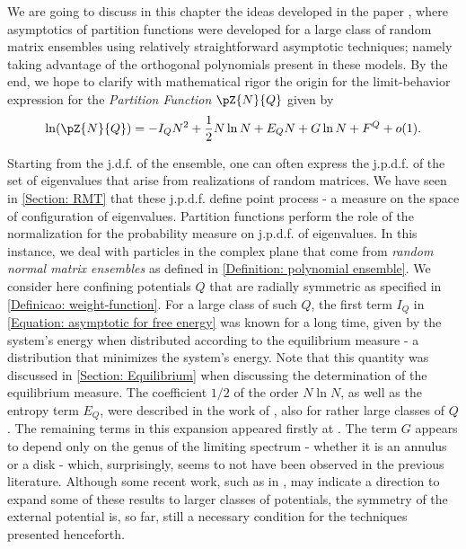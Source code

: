 We are going to discuss in this chapter the ideas developed in the paper , where asymptotics of partition functions were developed for a large class of random matrix ensembles using relatively straightforward asymptotic techniques; namely taking advantage of the orthogonal polynomials present in these models. By the end, we hope to clarify with mathematical rigor the origin for the limit-behavior expression for the \textit{Partition Function} $\pZ{N}{Q}$ given by
\begin{equation}
	\ln(\pZ{N}{Q}) = -I_Q N^2+\frac{1}{2} N\ln N+E_Q N+G\ln N+F^Q + o(1).
	\label{Equation: asymptotic for free energy}
\end{equation}

Starting from the j.d.f. of the ensemble, one can often express the j.p.d.f. of the set of eigenvalues that arise from realizations of random matrices. We have seen in \autoref{Section: RMT} that these j.p.d.f. define point process - a measure on the space of configuration of eigenvalues. Partition functions perform the role of the normalization for the probability measure on j.p.d.f. of eigenvalues. In this instance, we deal with particles in the complex plane that come from \textit{random normal matrix ensembles} as defined in \autoref{Definition: polynomial ensemble}. We consider here confining potentials $Q$ that are radially symmetric as specified in \autoref{Definicao: weight-function}. For a large class of such $Q$, the first term $I_Q$ in \eqref{Equation: asymptotic for free energy} was known for a long time, given by the system's energy when distributed according to the equilibrium measure - a distribution that minimizes the system's energy. Note that this quantity was discussed in \autoref{Section: Equilibrium} when discussing the determination of the equilibrium measure. The coefficient $1/2$ of the order $N\ln N$, as well as the entropy term $E_Q$, were described in the work of , also for rather large classes of $Q$. The remaining terms in this expansion appeared firstly at . The term $G$ appears to depend only on the genus of the limiting spectrum -  whether it is an annulus or a disk  - which, surprisingly, seems to not have been observed in the previous literature.  Although some recent work, such as in , may indicate a direction to expand some of these results to larger classes of potentials, the symmetry of the external potential is, so far, still a necessary condition for the techniques presented henceforth.

